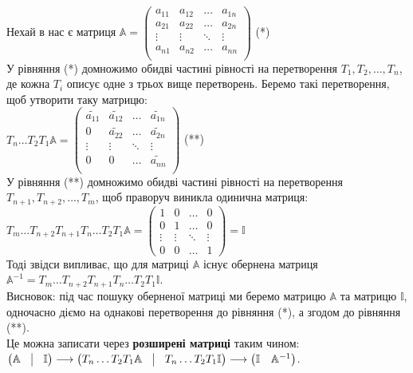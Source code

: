 \documentclass[a4paper, 10pt]{article}
\theoremstyle{theoremdd}
\begin{document}
Нехай в нас є матриця $\mathbb{A} = \begin{pmatrix}
a_{11} & a_{12} & \dots & a_{1n} \\
a_{21} & a_{22} & \dots & a_{2n} \\
\vdots & \vdots & \ddots & \vdots \\
a_{n1} & a_{n2} & \dots & a_{nn} \\
\end{pmatrix}$ (*) \\
У рівняння (*) домножимо обидві частині рівності на перетворення $T_1,T_2, \dots, T_n$, де кожна $T_i$ описує одне з трьох вище перетворень. Беремо такі перетворення, щоб утворити таку матрицю:\\
$T_n \dots T_2 T_1 \mathbb{A} = \begin{pmatrix}
\tilde{a_{11}} & \tilde{a_{12}} & \dots & \tilde{a_{1n}} \\
0 & \tilde{a_{22}} & \dots & \tilde{a_{2n}} \\
\vdots & \vdots & \ddots & \vdots \\
0 & 0 & \dots & \tilde{a_{nn}} \\
\end{pmatrix}$ (**) \\
У рівняння (**) домножимо обидві частині рівності на перетворення $T_{n+1}, T_{n+2},\dots, T_m$, щоб праворуч виникла одинична матриця:\\
$T_m \dots T_{n+2} T_{n+1} T_n \dots T_2 T_1 \mathbb{A} = \begin{pmatrix}
1 & 0 & \dots & 0 \\
0 & 1 & \dots & 0 \\
\vdots & \vdots & \ddots & \vdots \\
0 & 0 & \dots & 1
\end{pmatrix} = \mathbb{I}$\\
Тоді звідси випливає, що для матриці $\mathbb{A}$ існує обернена матриця $\mathbb{A}^{-1} = T_m \dots T_{n+2} T_{n+1} T_n \dots T_2 T_1 \mathbb{I}$.
\bigskip \\
Висновок: під час пошуку оберненої матриці ми беремо матрицю $\mathbb{A}$ та матрицю $\mathbb{I}$, одночасно діємо на однакові перетворення до рівняння (*), а згодом до рівняння (**).\\
Це можна записати через \textbf{розширені матриці} таким чином:\\
$\begin{pmatrix}
\mathbb{A} & \vline & \mathbb{I}
\end{pmatrix} \longrightarrow \begin{pmatrix}
T_n \dots T_2 T_1 \mathbb{A} & \vline & T_n \dots T_2 T_1 \mathbb{I}
\end{pmatrix} \longrightarrow \begin{pmatrix}
\mathbb{I} & \mathbb{A}^{-1}
\end{pmatrix}$.
\end{document}
